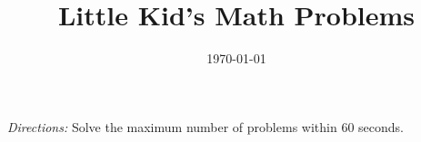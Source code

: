 \documentclass[12pt]{article} %
\title{\vspace{-2.5cm}Little Kid's Math Problems}
\date{\vspace{-2.5cm}\today}
\begin{document}
\maketitle{\vspace{-0.5cm}}

\textit{Directions:} Solve the maximum number of problems within 60 seconds.\vspace{-1.2cm}


\end{document}
